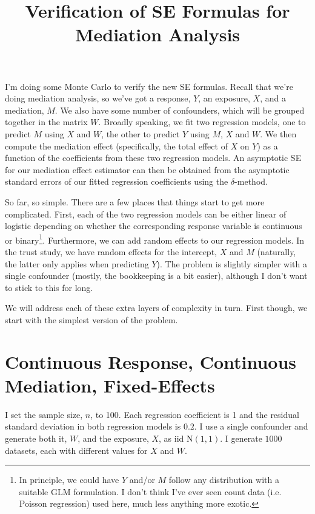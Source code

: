 \documentclass{article}
\title{Verification of SE Formulas for Mediation Analysis}
\begin{document}
\maketitle

I'm doing some Monte Carlo to verify the new SE formulas. Recall that we're doing mediation analysis, so we've got a response, $Y$, an exposure, $X$, and a mediation, $M$. We also have some number of confounders, which will be grouped together in the matrix $W$. Broadly speaking, we fit two regression models, one to predict $M$ using $X$ and $W$, the other to predict $Y$ using $M$, $X$ and $W$. We then compute the mediation effect (specifically, the total effect of $X$ on $Y$) as a function of the coefficients from these two regression models. An asymptotic SE for our mediation effect estimator can then be obtained from the asymptotic standard errors of our fitted regression coefficients using the $\delta$-method.

So far, so simple. There are a few places that things start to get more complicated. First, each of the two regression models can be either linear of logistic depending on whether the corresponding response variable is continuous or binary\footnote{In principle, we could have $Y$ and/or $M$ follow any distribution with a suitable GLM formulation. I don't think I've ever seen count data (i.e. Poisson regression) used here, much less anything more exotic.}. Furthermore, we can add random effects to our regression models. In the trust study, we have random effects for the intercept, $X$ and $M$ (naturally, the latter only applies when predicting $Y$). The problem is slightly simpler with a single confounder (mostly, the bookkeeping is a bit easier), although I don't want to stick to this for long.

We will address each of these extra layers of complexity in turn. First though, we start with the simplest version of the problem. 

\section{Continuous Response, Continuous Mediation, Fixed-Effects}
\label{sec:cont_cont_fix}

I set the sample size, $n$, to 100. Each regression coefficient is 1 and the residual standard deviation in both regression models is $0.2$. I use a single confounder and generate both it, $W$, and the exposure, $X$, as iid $\mathrm{N}(1,1)$. I generate $1000$ datasets, each with different values for $X$ and $W$. 
\end{document}
